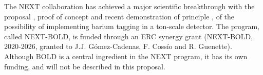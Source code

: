 
The NEXT collaboration has achieved a major scientific breakthrough with the proposal \cite{Nygren_2015}, proof of concept \cite{McDonald:2017izm} and recent demonstration of principle \cite{ rivilla_fluorescent_2020}, of the possibility of implementing barium tagging in a ton-scale detector. The program, called NEXT-BOLD, is funded through an ERC synergy grant (NEXT-BOLD, 2020-2026, granted to J.J. G\'omez-Cadenas, F. Coss\'io and R. Guenette). Although BOLD is a central ingredient in the NEXT program, it has its own funding, and will not be described in this proposal. 
